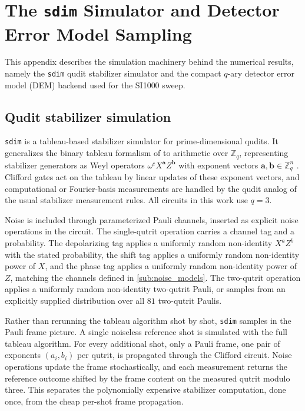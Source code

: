 \section{The \texttt{sdim} Simulator and Detector Error Model Sampling}
\label{sec:sdim-dem}

This appendix describes the simulation machinery behind the numerical results, namely the \texttt{sdim} qudit stabilizer simulator and the compact $q$-ary detector error model (DEM) backend used for the SI1000 sweep.

\subsection{Qudit stabilizer simulation}

\texttt{sdim} \cite{sdim} is a tableau-based stabilizer simulator for prime-dimensional qudits. It generalizes the binary tableau formalism of \cite{Aaronson2004} to arithmetic over $\mathbb{Z}_q$, representing stabilizer generators as Weyl operators $\omega^c X^{\mathbf{a}} Z^{\mathbf{b}}$ with exponent vectors $\mathbf{a}, \mathbf{b} \in \mathbb{Z}_q^n$ \cite{Gottesman1999,Hostens2005}. Clifford gates act on the tableau by linear updates of these exponent vectors, and computational or Fourier-basis measurements are handled by the qudit analog of the usual stabilizer measurement rules. All circuits in this work use $q=3$.

Noise is included through parameterized Pauli channels, inserted as explicit noise operations in the circuit. The single-qutrit operation carries a channel tag and a probability. The depolarizing tag applies a uniformly random non-identity $X^a Z^b$ with the stated probability, the shift tag applies a uniformly random non-identity power of $X$, and the phase tag applies a uniformly random non-identity power of $Z$, matching the channels defined in \autoref{sub:noise_models}. The two-qutrit operation applies a uniformly random non-identity two-qutrit Pauli, or samples from an explicitly supplied distribution over all $81$ two-qutrit Paulis.

Rather than rerunning the tableau algorithm shot by shot, \texttt{sdim} samples in the Pauli frame picture. A single noiseless reference shot is simulated with the full tableau algorithm. For every additional shot, only a Pauli frame, one pair of exponents $(a_i, b_i)$ per qutrit, is propagated through the Clifford circuit. Noise operations update the frame stochastically, and each measurement returns the reference outcome shifted by the frame content on the measured qutrit modulo three. This separates the polynomially expensive stabilizer computation, done once, from the cheap per-shot frame propagation.

